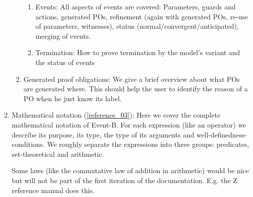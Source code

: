 \begin{enumerate}
\begin{enumerate}
\begin{enumerate}
    \item Events: All aspects of events are covered: Parameters, guards and actions,
      generated POs, refinement (again with generated POs, re-use of parameters, witnesses),
      status (normal/convergent/anticipated), merging of events.
    \item Termination: How to prove termination by the model's variant and the status of events
    \end{enumerate}
  \item Generated proof obligations: We give a brief overview about what POs are generated
    where. This should help the user to identify the reason of a PO when he just know its label.
  \end{enumerate}
\item Mathematical notation (\ref{reference_03}):
  Here we cover the complete mathematical notation of Event-B. For each expression
  (like an operator) we describe its purpose, its type, the type of its arguments and
  well-definedness-conditions. 
  We roughly separate the expressions into three groups: predicates, set-theoretical and arithmetic.

  Some laws (like the commutative law of addition in arithmetic) would be nice but will not be part of the first
  iteration of the documentation. E.g. the Z reference manual does this.


\end{enumerate}
